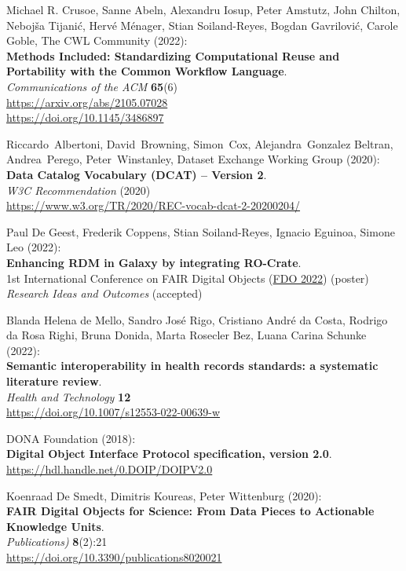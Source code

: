 \begin{thebibliography}{9}
Michael R. Crusoe, Sanne Abeln, Alexandru Iosup, Peter
Amstutz, John Chilton, Nebojša Tijanić, Hervé Ménager, Stian
Soiland-Reyes, Bogdan Gavrilović, Carole Goble, The CWL Community
(2022):\\
\textbf{Methods Included: Standardizing
Computational Reuse and Portability with the Common Workflow
Language}.\\
\emph{Communications of the ACM} \textbf{65}(6)\\
\url{https://arxiv.org/abs/2105.07028}\\
\url{https://doi.org/10.1145/3486897}

Riccardo~Albertoni, David~Browning, Simon~Cox,
Alejandra~Gonzalez Beltran, Andrea~Perego, Peter~Winstanley, Dataset
Exchange Working Group (2020):\\
\textbf{Data Catalog Vocabulary (DCAT) -- Version 2}.\\
\emph{W3C Recommendation} (2020)\\
\url{https://www.w3.org/TR/2020/REC-vocab-dcat-2-20200204/}


Paul De Geest, Frederik Coppens, Stian
Soiland-Reyes, Ignacio Eguinoa, Simone Leo (2022):\\
\textbf{Enhancing RDM in Galaxy by integrating RO-Crate}.\\
1st International Conference on FAIR Digital Objects
(\href{https://www.fdo2022.org/}{FDO 2022}) (poster)\\
\emph{Research Ideas and Outcomes} (accepted)

Blanda Helena de Mello, Sandro José Rigo, Cristiano
André da Costa, Rodrigo da Rosa Righi, Bruna Donida, Marta Rosecler Bez,
Luana Carina Schunke (2022):\\
\textbf{Semantic interoperability in health records standards: a
systematic literature review}.\\
\emph{Health and Technology} \textbf{12}\\
\url{https://doi.org/10.1007/s12553-022-00639-w}

DONA Foundation (2018):\\
\textbf{Digital Object Interface Protocol specification, version 2.0}.\\
\url{https://hdl.handle.net/0.DOIP/DOIPV2.0}

Koenraad De Smedt, Dimitris Koureas, Peter
Wittenburg (2020):\\
\textbf{FAIR Digital Objects for Science: From Data Pieces to Actionable
Knowledge Units}.\\
\emph{Publications)} \textbf{8}(2):21\\
\url{https://doi.org/10.3390/publications8020021}



\end{thebibliography}
